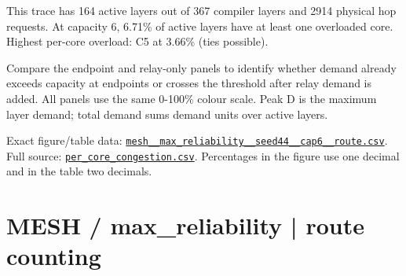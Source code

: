 \documentclass[10pt,a4paper]{article}
\begin{document}
This trace has 164 active layers out of 367 compiler layers and 2914 physical hop requests. At capacity 6, 6.71\% of active layers have at least one overloaded core. Highest per-core overload: C5 at 3.66\% (ties possible).\par
Compare the endpoint and relay-only panels to identify whether demand already exceeds capacity at endpoints or crosses the threshold after relay demand is added. All panels use the same 0-100\% colour scale. Peak D is the maximum layer demand; total demand sums demand units over active layers.\par
Exact figure/table data: \href{\detokenize{file:///home/dhruv-pansuriya/Documents/BTP/Compiler-Driven-ACE/output/pdf/qaoa_methods_congestion/tables/mesh__max_reliability__seed44__cap6__route.csv}}{\nolinkurl{mesh__max_reliability__seed44__cap6__route.csv}}. Full source: \href{\detokenize{file:///home/dhruv-pansuriya/Documents/BTP/Compiler-Driven-ACE/results/qaoa_2seed_2026-10-26/congestion/per_core_congestion.csv}}{\nolinkurl{per_core_congestion.csv}}. Percentages in the figure use one decimal and in the table two decimals.\par
\clearpage
\section*{MESH / max\_reliability | route counting}
\end{document}
